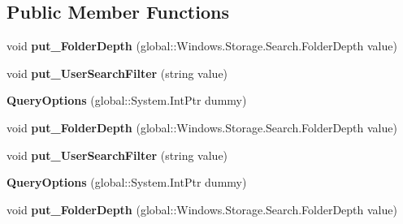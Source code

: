 \subsection*{Public Member Functions}
\begin{DoxyCompactItemize}
\item 
\mbox{\label{class_windows_1_1_storage_1_1_search_1_1_query_options_ab7684034a5a2464b47e93cc3a2c6fa99}} 
void {\bfseries put\+\_\+\+Folder\+Depth} (global\+::\+Windows.\+Storage.\+Search.\+Folder\+Depth value)
\item 
\mbox{\label{class_windows_1_1_storage_1_1_search_1_1_query_options_a7f301369c52cdaf3a276f6c42cf13ae0}} 
void {\bfseries put\+\_\+\+User\+Search\+Filter} (string value)
\item 
\mbox{\label{class_windows_1_1_storage_1_1_search_1_1_query_options_a6a7f9860a657c7d34fbb7ab2c0192147}} 
{\bfseries Query\+Options} (global\+::\+System.\+Int\+Ptr dummy)
\item 
\mbox{\label{class_windows_1_1_storage_1_1_search_1_1_query_options_ab7684034a5a2464b47e93cc3a2c6fa99}} 
void {\bfseries put\+\_\+\+Folder\+Depth} (global\+::\+Windows.\+Storage.\+Search.\+Folder\+Depth value)
\item 
\mbox{\label{class_windows_1_1_storage_1_1_search_1_1_query_options_a7f301369c52cdaf3a276f6c42cf13ae0}} 
void {\bfseries put\+\_\+\+User\+Search\+Filter} (string value)
\item 
\mbox{\label{class_windows_1_1_storage_1_1_search_1_1_query_options_a6a7f9860a657c7d34fbb7ab2c0192147}} 
{\bfseries Query\+Options} (global\+::\+System.\+Int\+Ptr dummy)
\item 
\mbox{\label{class_windows_1_1_storage_1_1_search_1_1_query_options_ab7684034a5a2464b47e93cc3a2c6fa99}} 
void {\bfseries put\+\_\+\+Folder\+Depth} (global\+::\+Windows.\+Storage.\+Search.\+Folder\+Depth value)

\end{DoxyCompactItemize}
